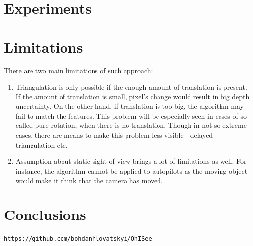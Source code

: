 \section{Experiments}

\section{Limitations}

There are two main limitations of such approach:
\begin{enumerate}
    \item Triangulation is only possible if the enough amount of translation is present. If the amount of translation is small, pixel's change would result in big depth uncertainty. On the other hand, if translation is too big, the algorithm may fail to match the features. This problem will be especially seen in cases of so-called pure rotation, when there is no translation. Though in not so extreme cases, there are means to make this problem less visible - delayed triangulation etc.
    \item Assumption about static sight of view brings a lot of limitations as well.  For instance, the algorithm cannot be applied to autopilots as the moving object would make it think that the camera has moved. 
\end{enumerate}

\section{Conclusions}

\appendix

\begin{thebibliography}{9}

 \texttt{https://github.com/bohdanhlovatskyi/OhISee}

\end{thebibliography}

